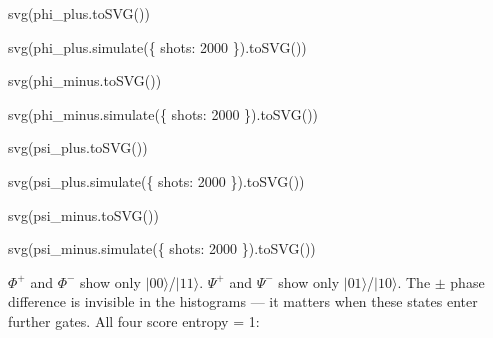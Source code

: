 \documentclass[
  11pt,
  letterpaper,
  oneside]{scrbook}
\newenvironment{Shaded}{\begin{snugshade}}{\end{snugshade}}
\newcommand{\NormalTok}[1]{\textcolor[rgb]{0.00,0.23,0.31}{#1}}
\begin{document}
\begin{Shaded}
\begin{Highlighting}[]
\NormalTok{svg(phi\_plus.toSVG())}
\end{Highlighting}
\end{Shaded}

\begin{Shaded}
\begin{Highlighting}[]
\NormalTok{svg(phi\_plus.simulate(\{ shots: 2000 \}).toSVG())}
\end{Highlighting}
\end{Shaded}

\begin{Shaded}
\begin{Highlighting}[]
\NormalTok{svg(phi\_minus.toSVG())}
\end{Highlighting}
\end{Shaded}

\begin{Shaded}
\begin{Highlighting}[]
\NormalTok{svg(phi\_minus.simulate(\{ shots: 2000 \}).toSVG())}
\end{Highlighting}
\end{Shaded}

\begin{Shaded}
\begin{Highlighting}[]
\NormalTok{svg(psi\_plus.toSVG())}
\end{Highlighting}
\end{Shaded}

\begin{Shaded}
\begin{Highlighting}[]
\NormalTok{svg(psi\_plus.simulate(\{ shots: 2000 \}).toSVG())}
\end{Highlighting}
\end{Shaded}

\begin{Shaded}
\begin{Highlighting}[]
\NormalTok{svg(psi\_minus.toSVG())}
\end{Highlighting}
\end{Shaded}

\begin{Shaded}
\begin{Highlighting}[]
\NormalTok{svg(psi\_minus.simulate(\{ shots: 2000 \}).toSVG())}
\end{Highlighting}
\end{Shaded}

\(\Phi^+\) and \(\Phi^-\) show only \(|00\rangle\)/\(|11\rangle\).
\(\Psi^+\) and \(\Psi^-\) show only \(|01\rangle\)/\(|10\rangle\). The
\(\pm\) phase difference is invisible in the histograms --- it matters
when these states enter further gates. All four score entropy = 1:
\end{document}
